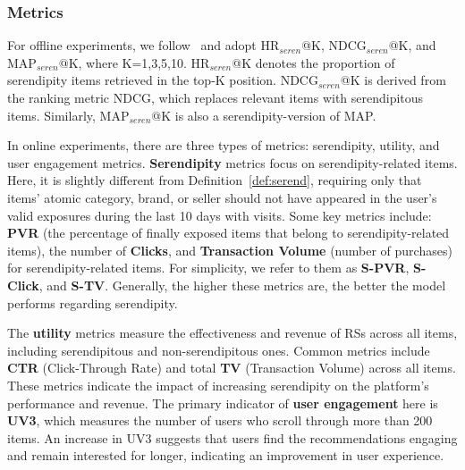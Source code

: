 \subsubsection{Metrics}\label{sec:metrics} For offline experiments, we follow~\cite{fu2023wisdom,fu2024art} and adopt HR$_{seren}$@K, NDCG$_{seren}$@K, and MAP$_{seren}$@K, where K=1,3,5,10. HR$_{seren}$@K denotes the proportion of serendipity items retrieved in the top-K position. NDCG$_{seren}$@K is derived from the ranking metric NDCG, which replaces relevant items with serendipitous items. Similarly, MAP$_{seren}$@K is also a serendipity-version of MAP. 

In online experiments, there are three types of metrics: serendipity, utility, and user engagement metrics. \textbf{Serendipity} metrics focus on serendipity-related items. Here, it is slightly different from Definition~\ref{def:serend}, requiring only that items' atomic category, brand, or seller should not have appeared in the user's valid exposures during the last 10 days with visits. Some key metrics include:  \textbf{PVR} (the percentage of finally exposed items that belong to serendipity-related items), the number of \textbf{Clicks}, and \textbf{Transaction Volume} (number of purchases) for serendipity-related items. For simplicity, we refer to them as \textbf{S-PVR}, \textbf{S-Click}, and \textbf{S-TV}. Generally, the higher these metrics are, the better the model performs regarding serendipity.

The \textbf{utility} metrics measure the effectiveness and revenue of RSs across all items, including serendipitous and non-serendipitous ones. Common metrics include \textbf{CTR} (Click-Through Rate) and total \textbf{TV} (Transaction Volume) across all items. These metrics indicate the impact of increasing serendipity on the platform's performance and revenue.  The primary indicator of \textbf{user engagement} here is \textbf{UV3}, which measures the number of users who scroll through more than 200 items. An increase in UV3 suggests that users find the recommendations engaging and remain interested for longer, indicating an improvement in user experience.


